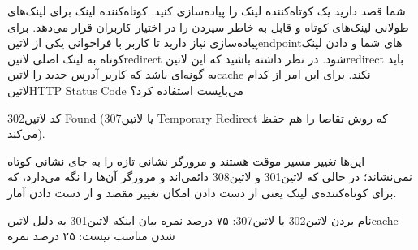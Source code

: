 
شما قصد دارید یک کوتاه‌کننده لینک را پیاده‌سازی کنید. کوتاه‌کننده لینک برای لینک‌های طولانی لینک‌های کوتاه و قابل به خاطر سپردن را در اختیار کاربران قرار می‌دهد.
برای پیاده‌سازی نیاز دارید تا کاربر با فراخوانی یکی از ‌لاتین{endpoint}های شما و دادن لینک کوتاه به لینک اصلی ‌لاتین{redirect} شود.
در نظر داشته باشید که این ‌لاتین{redirect} باید به گونه‌ای باشد که کاربر آدرس جدید را ‌لاتین{cache} نکند.
برای این امر از کدام ‌لاتین{HTTP Status Code} می‌بایست استفاده کرد؟


\begin{پاسخ}

کد ‌لاتین{302 Found} (یا ‌لاتین{307 Temporary Redirect} که روش تقاضا را هم حفظ می‌کند).

این‌ها تغییر مسیر موقت هستند و مرورگر نشانی تازه را به جای نشانی کوتاه نمی‌نشاند؛
در حالی که ‌لاتین{301} و ‌لاتین{308} دائمی‌اند و مرورگر آن‌ها را نگه می‌دارد،
که برای کوتاه‌کننده‌ی لینک یعنی از دست دادن امکان تغییر مقصد و از دست دادن آمار.

 نام بردن ‌لاتین{302} یا ‌لاتین{307}: ۷۵ درصد نمره
 بیان اینکه ‌لاتین{301} به دلیل ‌لاتین{cache} شدن مناسب نیست: ۲۵ درصد نمره

\end{پاسخ}
